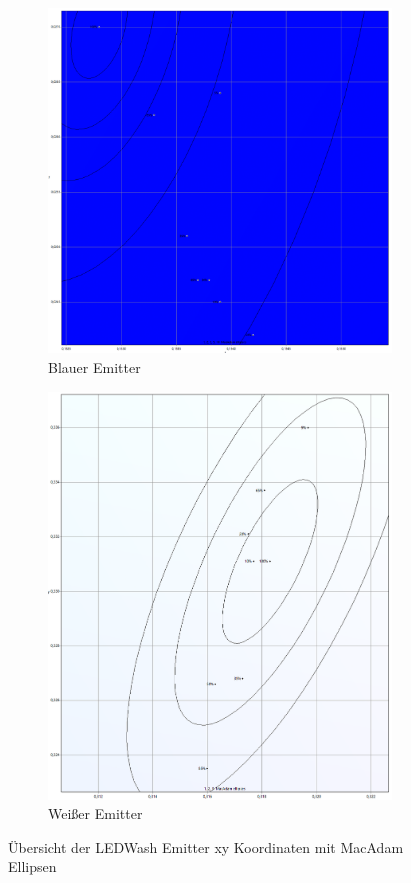 \documentclass[11pt]{scrartcl}
\begin{document}
\begin{figure}[H]
    \begin{subfigure}[b]{.49\textwidth}
        \includegraphics[width=\textwidth]{images/macAdam/led_wash_300Blue.png}
        \caption{Blauer Emitter}
    \end{subfigure}
    \hfill 
    \begin{subfigure}[b]{.49\textwidth}
        \includegraphics[width=\textwidth]{images/macAdam/led_wash_300White.png}
        \caption{Weißer Emitter}
    \end{subfigure}
    \caption{Übersicht der LEDWash Emitter xy Koordinaten mit MacAdam Ellipsen}
\end{figure}
\end{document}
